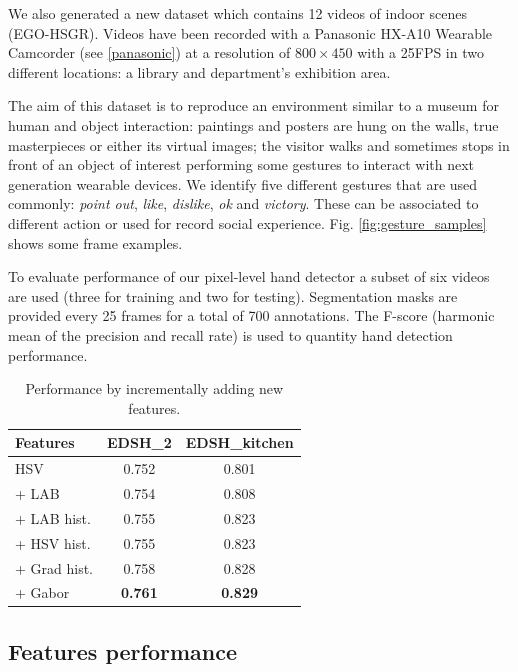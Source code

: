 We also generated a new dataset which contains 12 videos of indoor scenes (EGO-HSGR). Videos have been recorded with a Panasonic HX-A10 Wearable Camcorder (see \ref{panasonic}) at a resolution of $800 \times 450$ with a 25FPS in two different locations: a library and department's exhibition area.   

The aim of this dataset is to reproduce an environment similar to a museum for human and object interaction: paintings and posters are hung on the walls, true masterpieces or either its virtual images; the visitor walks and sometimes stops in front of an object of interest performing some gestures to interact with next generation wearable devices. We identify five different gestures that are used commonly: \textit{point out}, \textit{like}, \textit{dislike}, \textit{ok} and \textit{victory}. These can be associated to different action or used for record social experience. Fig. \ref{fig:gesture_samples} shows some frame examples. 

To evaluate performance of our pixel-level hand detector a subset of six videos are used (three for training and two for testing). Segmentation masks are provided every 25 frames for a total of 700 annotations. 
The F-score (harmonic mean of the precision and recall rate) is used to quantity hand detection performance.
    
 \begin{table}
 \centering
 \begin{tabular}{|l|c|c|}
 \hline
 \textbf{Features} 	& \textbf{EDSH\_2} & \textbf{EDSH\_{kitchen}}	\\ \hline\hline
 HSV	& 0.752 & 0.801		\\ \hline
 + LAB	& 0.754	&	0.808 \\ \hline
 + LAB hist.	& 0.755 & 0.823			\\ \hline  
 + HSV hist. & 0.755 & 0.823			\\ \hline  
 + Grad hist. & 0.758	&	0.828	\\ \hline  
 + Gabor & 	\textbf{0.761}	& \textbf{0.829} \\ \hline  
 \end{tabular}
 \caption{Performance by incrementally adding new features.}\label{tab:localfeatures}
 \end{table}

\subsection{Features performance}

